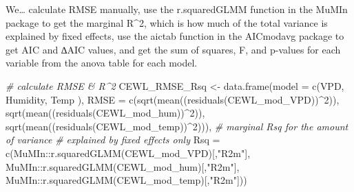 \documentclass[
]{article}
\newenvironment{Shaded}{\begin{snugshade}}{\end{snugshade}}
\newcommand{\AttributeTok}[1]{\textcolor[rgb]{0.77,0.63,0.00}{#1}}
\newcommand{\CommentTok}[1]{\textcolor[rgb]{0.56,0.35,0.01}{\textit{#1}}}
\newcommand{\DecValTok}[1]{\textcolor[rgb]{0.00,0.00,0.81}{#1}}
\newcommand{\FunctionTok}[1]{\textcolor[rgb]{0.00,0.00,0.00}{#1}}
\newcommand{\NormalTok}[1]{#1}
\newcommand{\OtherTok}[1]{\textcolor[rgb]{0.56,0.35,0.01}{#1}}
\newcommand{\SpecialCharTok}[1]{\textcolor[rgb]{0.00,0.00,0.00}{#1}}
\newcommand{\StringTok}[1]{\textcolor[rgb]{0.31,0.60,0.02}{#1}}
\begin{document}
We\ldots{} calculate RMSE manually, use the r.squaredGLMM function in
the MuMIn package to get the marginal R\^{}2, which is how much of the
total variance is explained by fixed effects, use the aictab function in
the AICmodavg package to get AIC and ∆AIC values, and get the sum of
squares, F, and p-values for each variable from the anova table for each
model.

\begin{Shaded}
\begin{Highlighting}[]
\CommentTok{\# calculate RMSE \& R\^{}2}
\NormalTok{CEWL\_RMSE\_Rsq }\OtherTok{\textless{}{-}} \FunctionTok{data.frame}\NormalTok{(}\AttributeTok{model =} 
                               \FunctionTok{c}\NormalTok{(}\StringTok{\textquotesingle{}VPD\textquotesingle{}}\NormalTok{,}
                                 \StringTok{\textquotesingle{}Humidity\textquotesingle{}}\NormalTok{,}
                                 \StringTok{\textquotesingle{}Temp\textquotesingle{}}
\NormalTok{                                 ),}
                           \AttributeTok{RMSE =} \FunctionTok{c}\NormalTok{(}\FunctionTok{sqrt}\NormalTok{(}\FunctionTok{mean}\NormalTok{((}\FunctionTok{residuals}\NormalTok{(CEWL\_mod\_VPD))}\SpecialCharTok{\^{}}\DecValTok{2}\NormalTok{)),}
                                    \FunctionTok{sqrt}\NormalTok{(}\FunctionTok{mean}\NormalTok{((}\FunctionTok{residuals}\NormalTok{(CEWL\_mod\_hum))}\SpecialCharTok{\^{}}\DecValTok{2}\NormalTok{)),}
                                    \FunctionTok{sqrt}\NormalTok{(}\FunctionTok{mean}\NormalTok{((}\FunctionTok{residuals}\NormalTok{(CEWL\_mod\_temp))}\SpecialCharTok{\^{}}\DecValTok{2}\NormalTok{))),}
                           \CommentTok{\# marginal Rsq for the amount of variance}
                           \CommentTok{\# explained by fixed effects only}
                           \AttributeTok{Rsq =} \FunctionTok{c}\NormalTok{(MuMIn}\SpecialCharTok{::}\FunctionTok{r.squaredGLMM}\NormalTok{(CEWL\_mod\_VPD)[,}\StringTok{"R2m"}\NormalTok{],}
\NormalTok{                                   MuMIn}\SpecialCharTok{::}\FunctionTok{r.squaredGLMM}\NormalTok{(CEWL\_mod\_hum)[,}\StringTok{"R2m"}\NormalTok{],}
\NormalTok{                                   MuMIn}\SpecialCharTok{::}\FunctionTok{r.squaredGLMM}\NormalTok{(CEWL\_mod\_temp)[,}\StringTok{"R2m"}\NormalTok{]))}


\end{Highlighting}
\end{Shaded}
\end{document}
